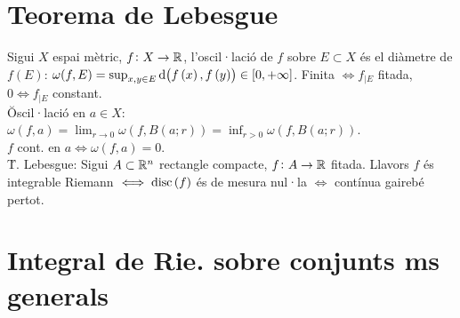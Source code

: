 \section{Teorema de Lebesgue}

\ci Sigui $X$ espai mètric, $f\colon X\to \mathbb{R}$, l'oscil·lació de $f$ sobre $E\subset X$ és el diàmetre de $f(E)$: $\omega(f,E) = \sup_{x,y\in E} \dif \left( f\left( x \right), f\left( y \right) \right) \in \left[ 0, +\infty \right]$. Finita $\iff f_{|E}$ fitada, $0\iff f_{|E}$ constant. \\
\u{Oscil·lació en $a\in X$}: $\omega\left( f,a \right) = \lim_{r\to 0}\omega\left( f, B\left( a;r \right) \right) = \inf_{r>0} \omega\left( f, B\left( a; r \right) \right)$. \\
\ci $f$ cont. en $a \iff \omega\left( f, a \right) = 0$. \\
\u{T. Lebesgue}: Sigui $A\subset \mathbb{R}^n$ rectangle compacte, $f\colon A\to \mathbb{R}$ fitada. Llavors $f$ és integrable Riemann $\iff \operatorname{disc}\left( f \right)$ és de mesura nul·la $\iff$ contínua gairebé pertot.

\section{Integral de Rie. sobre conjunts ms generals}


